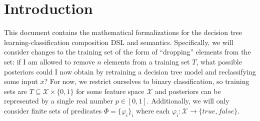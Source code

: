 \section{Introduction}

This document contains the mathematical formalizations
for the decision tree learning-classification composition
DSL and semantics.
Specifically, we will consider changes to the training set of the form of ``dropping''
elements from the set:
if I am allowed to remove $n$ elements from a training set $T$,
what possible posteriors could I now obtain by retraining a decision tree model
and reclassifying some input $x$?
For now, we restrict ourselves to binary classification,
so training sets are $T \subseteq \mathcal{X} \times \{0, 1\}$ for some feature space $\mathcal{X}$
and posteriors can be represented by a single real number $p \in [0, 1]$.
Additionally, we will only consider finite sets of predicates
$\Phi = \{\varphi_i\}_i$ where each
$\varphi_i : \mathcal{X} \rightarrow \{\mathit{true}, \mathit{false}\}$.
